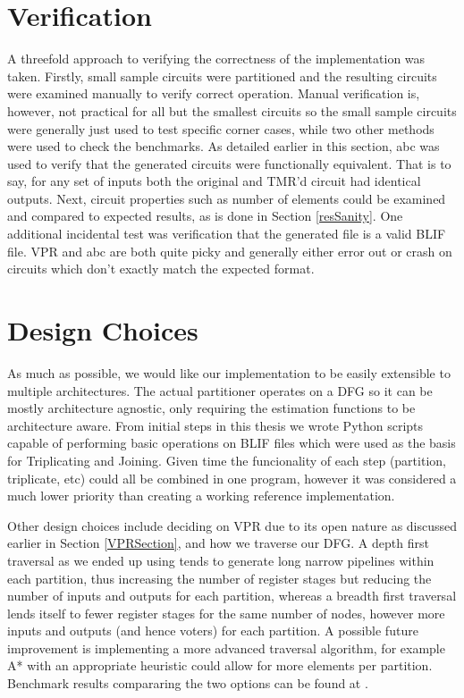\documentclass[12pt,final,oneside]{dwThesis} %
\begin{document}
   \section{Verification}
   A threefold approach to verifying the correctness of the implementation was taken.
   Firstly, small sample circuits were partitioned and the resulting circuits were examined manually to verify correct operation. Manual verification is, however, not practical for all but the smallest circuits so the small sample circuits were generally just used to test specific corner cases, while two other methods were used to check the benchmarks. As detailed earlier in this section, abc was used to verify that the generated circuits were functionally equivalent. That is to say, for any set of inputs both the original and TMR'd circuit had identical outputs.
   Next, circuit properties such as number of elements could be examined and compared to expected results, as is done in Section \ref{resSanity}.
   One additional incidental test was verification that the generated file is a valid \ac{BLIF} file. \ac{VPR} and abc are both quite picky and generally either error out or crash on circuits which don't exactly match the expected format.


   \section{Design Choices}
   As much as possible, we would like our implementation to be easily extensible to multiple architectures. The actual partitioner operates on a \ac{DFG} so it can be mostly architecture agnostic, only requiring the estimation functions to be architecture aware.
   From initial steps in this thesis we wrote Python scripts capable of performing basic operations on \ac{BLIF} files which were used as the basis for Triplicating and Joining. Given time the funcionality of each step (partition, triplicate, etc) could all be combined in one program, however it was considered a much lower priority than creating a working reference implementation.

   Other design choices include deciding on \ac{VPR} due to its open nature as discussed earlier in Section \ref{VPRSection}, and how we traverse our \ac{DFG}. A depth first traversal as we ended up using tends to generate long narrow pipelines within each partition, thus increasing the number of register stages but reducing the number of inputs and outputs for each partition, whereas a breadth first traversal lends itself to fewer register stages for the same number of nodes, however more inputs and outputs (and hence voters) for each partition. A possible future improvement is implementing a more advanced traversal algorithm, for example A* with an appropriate heuristic could allow for more elements per partition. Benchmark results compararing the two options can be found at .
\end{document}
